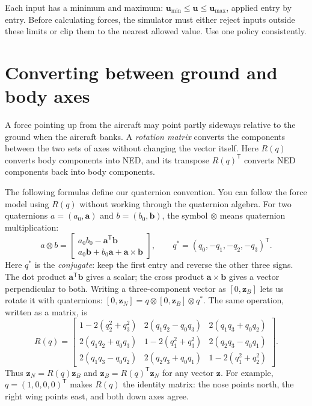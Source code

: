 \documentclass[11pt,a4paper]{article}
\numberwithin{equation}{section}
\newcommand{\vect}[1]{\boldsymbol{#1}}
\newcommand{\trans}{^{\mathsf T}}
\begin{document}
Each input has a minimum and maximum:
$\vect u_{\min}\leq\vect u\leq\vect u_{\max}$, applied entry by entry.
Before calculating forces, the simulator must either reject inputs outside
these limits or clip them to the nearest allowed value. Use one policy
consistently.

\section{Converting between ground and body axes}
A force pointing up from the aircraft may point partly sideways relative
to the ground when the aircraft banks. A \emph{rotation matrix} converts
the components between the two sets of axes without changing the vector
itself. Here $R(q)$ converts body components into NED, and its transpose
$R(q)\trans$ converts NED components back into body components.

The following formulas define our quaternion convention. You can follow
the force model using $R(q)$ without working through the quaternion algebra.
For two quaternions $a=(a_0,\vect a)$ and $b=(b_0,\vect b)$, the symbol
$\otimes$ means quaternion multiplication:
\begin{equation}
 a\otimes b=
 \begin{bmatrix}
 a_0b_0-\vect a\trans\vect b\\
 a_0\vect b+b_0\vect a+\vect a\times\vect b
 \end{bmatrix},\qquad q^*=(q_0,-q_1,-q_2,-q_3)\trans.
\end{equation}
Here $q^*$ is the \emph{conjugate}: keep the first entry and reverse the
other three signs. The dot product $\vect a\trans\vect b$ gives a scalar;
the cross product $\vect a\times\vect b$ gives a vector perpendicular to both.
Writing a three-component vector as $[0,\vect z_B]$ lets us rotate it with
quaternions: $[0,\vect z_N]=q\otimes[0,\vect z_B]\otimes q^*$.
The same operation, written as a matrix, is
\begin{equation}\label{eq:rotation}
R(q)=\begin{bmatrix}
1-2(q_2^2+q_3^2)&2(q_1q_2-q_0q_3)&2(q_1q_3+q_0q_2)\\
2(q_1q_2+q_0q_3)&1-2(q_1^2+q_3^2)&2(q_2q_3-q_0q_1)\\
2(q_1q_3-q_0q_2)&2(q_2q_3+q_0q_1)&1-2(q_1^2+q_2^2)
\end{bmatrix}.
\end{equation}
Thus $\vect z_N=R(q)\vect z_B$ and
$\vect z_B=R(q)\trans\vect z_N$ for any vector $\vect z$.
For example, $q=(1,0,0,0)\trans$ makes $R(q)$ the identity matrix:
the nose points north, the right wing points east, and both down axes agree.
\end{document}
